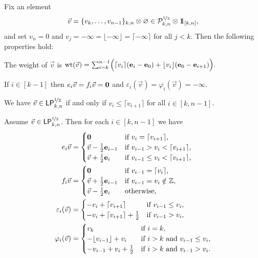 \documentclass[11pt]{article}
\begin{document}
\begin{lemma}
\label{lemma:PCrys_structure}
Fix an element
\[
\vec{v} = \uj{k,n}{v_k, \dotsc, v_{n-1}}\otimes \varnothing \in \sqrtE_{k,n}\otimes \one_{[k,n]},
\] 
and set $v_n=0$ and $v_j = -\infty = \lfloor -\infty \rfloor = \lceil -\infty \rceil$ for all $j < k$.
Then the following properties hold:
\ben

\item[(a)] 
The weight of $\vec{v}$ is
$%
\weight(\vec{v}) = \sum_{i=k}^{n-1}\Bigl( \lceil v_i \rceil (\e_i-\e_0) + \lfloor v_i \rfloor (\e_0-\e_{i+1})\Bigr).
$%

\item[(b)] If $i \in [k-1]$ then
$e_i \vec{v}=f_i\vec{v}=\boldsymbol{0}$
and $ \varepsilon_i(\vec{v})=\varphi_i(\vec{v})=-\infty$.

 \item[(c)] We have $\vec{v}\in\mathsf{LP}^{\nicefrac{1}{2}}_{k,n}$ if and only if $v_i \leq \lceil v_{i+1}\rceil$ for all $i \in [k,n-1]$. 
 
\item[(d)] Assume $\vec{v}\in\mathsf{LP}^{\nicefrac{1}{2}}_{k,n}$.
Then for each $i \in [k,n-1]$ we have
\begin{subequations}
\begin{align}
\label{vec-e-eq}
e_i \vec{v} & = \begin{cases}
\zero &\text{if $v_i= \lceil v_{i+1}\rceil$,} \\
\vec{v} - \frac{1}{2}\e_{i-1} &\text{if $v_{i-1} > v_i<\lceil v_{i+1}\rceil$,}  \\
\vec{v} + \frac{1}{2} \e_{i} &\text{if $v_{i-1} \leq v_i < \lceil v_{i+1}\rceil$,}
\end{cases}
\allowdisplaybreaks \\
\label{vec-f-eq}
f_i \vec{v} & = \begin{cases}
\zero  &\text{if $v_{i-1} =\lceil v_i\rceil $,} \\
\vec{v} + \frac{1}{2} \e_{i-1} &\text{if $v_{i-1} = v_i \notin \ZZ$,} \\ 
\vec{v} - \frac{1}{2} \e_{i} &\text{otherwise,} \\
\end{cases}
\allowdisplaybreaks \\
\label{vec-eps-eq}
\varepsilon_i(\vec{v}) &=  \begin{cases}
-v_i + \lceil v_{i+1}\rceil   & \text{if $v_{i-1} \leq v_i$}, \\
-v_i + \lceil v_{i+1}\rceil +  \frac{1}{2} &\text{if $v_{i-1} > v_i$}, \\
\end{cases}
\allowdisplaybreaks \\
\label{vec-phi-eq}
\varphi_i(\vec{v}) &=
 \begin{cases}
v_k & \text{if } i = k, \\
-\lfloor v_{i-1}\rfloor + v_i  & \text{if $i>k$ and $v_{i-1} \leq v_{i}$}, \\
-v_{i-1} + v_i+\tfrac{1}{2} & \text{if $i>k$ and $v_{i-1} >v_{i}$}.
\end{cases}
\end{align}
\end{subequations}


\een
\end{lemma}
\end{document}

